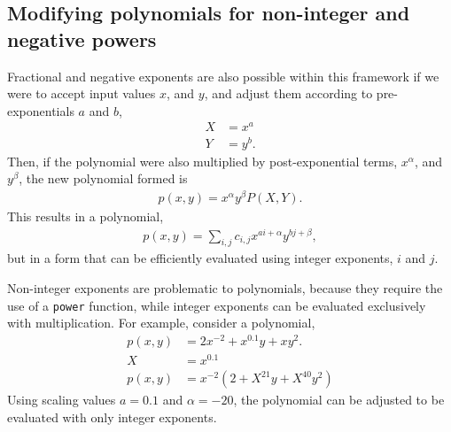 \subsection{Modifying polynomials for non-integer and negative powers}
Fractional and negative exponents are also possible within this framework if we were to accept input values $x$, and $y$, and adjust them according to pre-exponentials $a$ and $b$,
\begin{align}
X &= x^a\\
Y &= y^b.
\end{align}
Then, if the polynomial were also multiplied by post-exponential terms, $x^\alpha$, and $y^\beta$, the new polynomial formed is
\begin{align}
p(x,y) = x^\alpha y^\beta P(X,Y).
\end{align}
This results in a polynomial,
\begin{align}
p(x,y) = \sum_{i,j} c_{i,j} x^{ai+\alpha} y^{bj+\beta},\label{eqn:num:pxy}
\end{align}
but in a form that can be efficiently evaluated using integer exponents, $i$ and $j$.

Non-integer exponents are problematic to polynomials, because they require the use of a \texttt{power} function, while integer exponents can be evaluated exclusively with multiplication.  For example, consider a polynomial,
\begin{align}
p(x,y) &= 2x^{-2} + x^{0.1}y + xy^2.\nonumber\\
X &= x^{0.1}\nonumber\\
p(x,y) &= x^{-2}\left(2 + X^{21}y + X^{40}y^2 \right)\nonumber
\end{align}
Using scaling values $a = 0.1$ and $\alpha = -20$, the polynomial can be adjusted to be evaluated with only integer exponents.  

